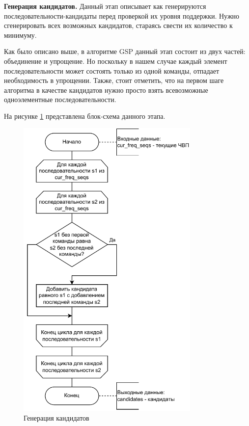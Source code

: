\textbf{Генерация кандидатов.}
Данный этап описывает как генерируются последовательности-кандидаты перед проверкой их уровня поддержки. Нужно сгенерировать всех возможных кандидатов, стараясь свести их количество к минимуму.

Как было описано выше, в алгоритме GSP данный этап состоит из двух частей: объединение и упрощение. Но поскольку в нашем случае каждый элемент последовательности может состоять только из одной команды, отпадает необходимость в упрощении. Также, стоит отметить, что на первом шаге алгоритма в качестве кандидатов нужно просто взять всевозможные одноэлементные последовательности.

На рисунке \ref{generateCandidates} представлена блок-схема данного этапа.

\newpage
\begin{figure}[h!]
	\centering
	\includegraphics[width=0.8\textwidth]{inc/img/generateCandidates.drawio.pdf}
	\caption{Генерация кандидатов}
	\label{generateCandidates}
\end{figure}

